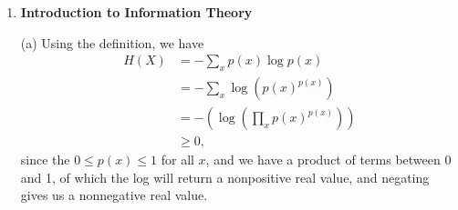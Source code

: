 \begin{enumerate}
    (two indices) Once again, there are $2n$ ways to choose $k$ and $j$ to produce this case. WLOG consider the five points 1, 2, 3, 4, 5, where $j = 2, k = 4$. Then corresponding to points 2 and 4 we can assign 8 possible ordered pairs such that both are almost fixed points: (1, 3), (1, 4), (1, 5), (2, 3), (2, 4), (2, 5), (3, 4), (3, 5). Similar to the previous case, the total expectation in this case would amount to
    \[
        2n \cdot \frac{8}{n(n-1)} = \frac{16}{n-1}.
    \]
    
    (more than two indices) Since there are $n(n-1)$ ways to pick any ordered pair of points, we subtract the previous two cases to get $n(n-1) - 4n = n^2 - 5n$ ways to choose $k$ and $j$ to produce this case. Since there is no interference between the two points, there would be $3\cdot3 = 9$ ways to assign almost fixed points. Therefore, the total expectation in this case would amount to
    \[
        (n^2 - 5n)\frac{9}{n(n-1)} = \frac{9n - 45}{n - 1}.
    \]
    
    Summing this all together, we get
    \begin{align*}
        \f{Var}(X) &= \frac{14}{n - 1} + \frac{16}{n - 1} + \frac{9n - 45}{n - 1} - 6 \\
            &= \frac{3n - 9}{n - 1} = 3 - \frac{6}{n - 1}.
    \end{align*}
    
    Now, noticing that the answers to case 3 and 4 satisfy the formula derived in case 5, we summarize:
    \[
    \f{Var}(X) = \begin{cases}
        0 & \f{ for } n = 1, 2, \\
        3 - \frac{6}{n - 1} & \f{ for } n > 2.
    \end{cases}
    \]
    
    \item \textbf{Introduction to Information Theory}
    
    (a) Using the definition, we have
    \begin{align*}
        H(X) &= -\sum_x p(x)\log p(x) \\
            &= -\sum_x \log \left(p(x)^{p(x)}\right) \\
            &= -\left(\log\left(\prod_x p(x)^{p(x)}\right)\right) \\
            &\geq 0,
    \end{align*}
    since the $0 \leq p(x) \leq 1$ for all $x$, and we have a product of terms between 0 and 1, of which the log will return a nonpositive real value, and negating gives us a nonnegative real value.
    

\end{enumerate}
